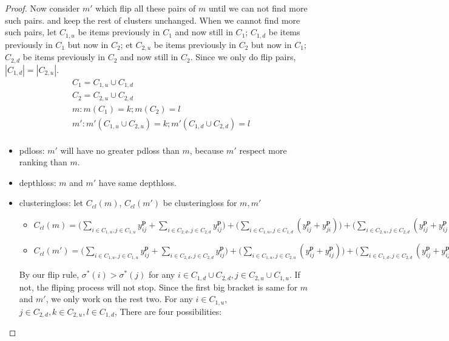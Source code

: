 \begin{proof}
	Now consider $m'$ which flip all these pairs of $m$ until we can not find more such pairs. and keep the rest of clusters unchanged. When we cannot find more such pairs, let $C_{1,u}$ be items previously in $C_1$ and now still in $C_1$;   $C_{1, d}$ be items previously in $C_1$ but now in $C_2$;  et $C_{2,u}$ be items previously in $C_2$ but now in $C_1$;   $C_{2, d}$ be items previously in $C_2$ and now still in $C_2$. Since we only do flip pairs, $|C_{1,d}|=|C_{2,u}|$.
	\begin{equation}
	\begin{split}
	&C_1=  C_{1,u}\cup C_{1,d}\\
		&C_2=  C_{2,u}\cup C_{2,d}\\
		&m: m(C_1)=k; m(C_2)=l\\
		&m': m'(C_{1, u}\cup C_{2, u})=k; m'(C_{1,d}\cup C_{2, d})=l\\
	\end{split}
	\end{equation}
	\begin{itemize}
		\item pdloss: $m'$ will have no greater pdloss than $m$, because $m'$ respect more ranking than $m$.
		\item depthloss: $m$ and $m'$ have same depthloss.
		\item clusteringloss: let $C_{cl}(m)$, $C_{cl}(m')$ be clusteringloss for $m, m'$
		\begin{itemize}
			\item $C_{cl}(m)=\bigg(\sum\limits_{i\in C_{1, u}, j\in C_{1, u}}y_{ij}^\mathbf{p} + \sum\limits_{i\in C_{2, d}, j\in C_{2, d}}y_{ij}^\mathbf{p} \bigg)+ \bigg(\sum\limits_{i\in C_{1, u}, j\in C_{1, d}}(y_{ij}^\mathbf{p}+y_{ji}^\mathbf{p}) \bigg)+\bigg( \sum\limits_{i\in C_{2, u}, j\in C_{2, d}}(y_{ij}^\mathbf{p}+y_{ij}^\mathbf{p})\bigg)$
						\item $C_{cl}(m')=\bigg(\sum\limits_{i\in C_{1, u}, j\in C_{1, u}}y_{ij}^\mathbf{p} + \sum\limits_{i\in C_{2, d}, j\in C_{2, d}}y_{ij}^\mathbf{p} \bigg)+ \bigg(\sum\limits_{i\in C_{1, u}, j\in C_{2, u}}(y_{ij}^\mathbf{p}+ y_{ij}^\mathbf{p})\bigg)+\bigg( \sum\limits_{i\in C_{1, d}, j\in C_{2, d}}(y_{ij}^\mathbf{p}+y_{ij}^\mathbf{p})\bigg)$
		\end{itemize}
	By our flip rule, $\sigma^*(i)>\sigma^*(j)$ for any $i\in C_{1,d}\cup C_{2,d}, j\in C_{2,u}\cup C_{1,u}$. If not, the fliping process will not stop. Since the first big bracket is same for $m$ and $m'$, we only work on the rest two. For any $i\in C_{1,u}$, $j\in C_{2,d}, k\in C_{2,u}, l\in C_{1,d} $, There are four possibilities:

\end{itemize}
\end{proof}
